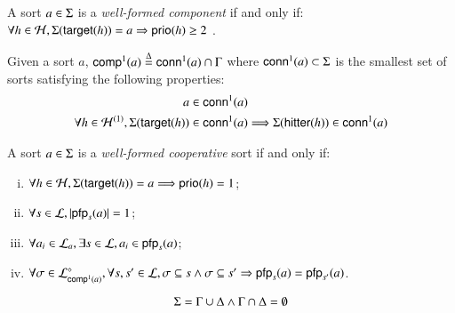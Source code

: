 \begin{definition}
\label{def:component}
A sort $a \in \PHs$ is a \emph{well-formed component} if and only if:
    $\forall h \in \PHh, \PHsort(\PHtarget(h)) = a \Rightarrow \prio(h) \geq 2$ \enspace.
\end{definition}

\begin{definition}
\label{def:conn}
Given a sort $a$, $\compin(a)\DEF \conn(a)\cap\components$ where
$\conn(a) \subset \PHs$ is the smallest set of sorts satisfying the following properties:
\begin{align*}
a\in\conn(a) &
\\
\forall h\in  \PHh^{(1)},
	\Sigma(\target{h})\in\conn(a) & \Longrightarrow \Sigma(\hitter{h})\in\conn(a)
\end{align*}
\end{definition}

%

\begin{definition}
\label{def:cs}
A sort $a \in \PHs$ is a \emph{well-formed cooperative} sort if and only if:
\begin{enumerate}[(i)]
\item $\forall h\in\PHh, \Sigma(\PHtarget(h))=a \Longrightarrow \prio(h) = 1$;
\item\label{csai} $\forall s\in\PHl, \card{\pfp_s(a)} = 1$;
\item\label{css} $\forall a_i \in \PHl_a, \exists s \in \PHl, a_i\in\pfp_s(a)$;
\item $\forall \sigma\in\PHsubl[\PHl]_{\compin(a)},
			\forall s,s'\in\PHl,
				\sigma\subseteq s\wedge \sigma\subseteq s'\Rightarrow 
							\pfp_s(a) = \pfp_{s'}(a)$\enspace.
\end{enumerate}
\end{definition}

\begin{condition}
\label{cr:compcs}
  $$\PHs = \components \cup \cs \wedge \components \cap \cs = \emptyset$$
\end{condition}

